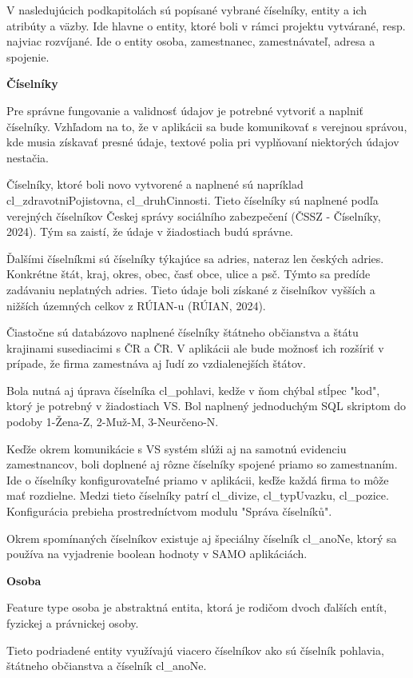 V nasledujúcich podkapitolách sú popísané vybrané číselníky, entity a ich atribúty a väzby. Ide hlavne o entity, ktoré boli v rámci projektu vytvárané, resp. najviac rozvíjané. Ide o entity osoba, zamestnanec, zamestnávateľ, adresa a spojenie.

\blank
\start\bf Číselníky\stop

Pre správne fungovanie a validnosť údajov je potrebné vytvoriť a naplniť číselníky. Vzhľadom na to, že v aplikácii sa bude komunikovať s verejnou správou, kde musia získavať presné údaje, textové polia pri vyplňovaní niektorých údajov nestačia. 

Číselníky, ktoré boli novo vytvorené a naplnené sú napríklad cl\_zdravotniPojistovna, cl\_druhCinnosti. Tieto číselníky sú naplnené podľa verejných číselníkov Českej správy sociálního zabezpečení \scr(ČSSZ - Číselníky, 2024). Tým sa zaistí, že údaje v žiadostiach budú správne. 

Ďalšími číselníkmi sú číselníky týkajúce sa adries, nateraz len českých adries. Konkrétne štát, kraj, okres, obec, časť obce, ulice a psč. Týmto sa predíde zadávaniu neplatných adries. Tieto údaje boli získané z čiselníkov vyšších a nižších územných celkov z RÚIAN-u \scr(RÚIAN, 2024).

Čiastočne sú databázovo naplnené číselníky štátneho občianstva a štátu krajinami susediacimi s ČR a ČR. V aplikácii ale bude možnosť ich rozšíriť v prípade, že firma zamestnáva aj ľudí zo vzdialenejších štátov.

Bola nutná aj úprava číselníka cl\_pohlavi, kedže v ňom chýbal stĺpec "kod", ktorý je potrebný v žiadostiach VS. Bol naplnený jednoduchým SQL skriptom do podoby 1-Žena-Z, 2-Muž-M, 3-Neurčeno-N.

Keďže okrem komunikácie s VS systém slúži aj na samotnú evidenciu zamestnancov, boli doplnené aj rôzne číselníky spojené priamo so zamestnaním. Ide o číselníky konfigurovateľné priamo v aplikácii, keďže každá firma to môže mať rozdielne. Medzi tieto číselníky patrí cl\_divize, cl\_typUvazku, cl\_pozice. Konfigurácia prebieha prostredníctvom modulu "Správa číselníků".

Okrem spomínaných číselníkov existuje aj špeciálny číselník cl_anoNe, ktorý sa používa na vyjadrenie boolean hodnoty v SAMO aplikáciách. 

\blank
\start\bf Osoba \stop

Feature type osoba je abstraktná entita, ktorá je rodičom dvoch ďalších entít, fyzickej a právnickej osoby. 

Tieto podriadené entity využívajú viacero číselníkov ako sú číselník pohlavia, štátneho občianstva a číselník cl_anoNe.

